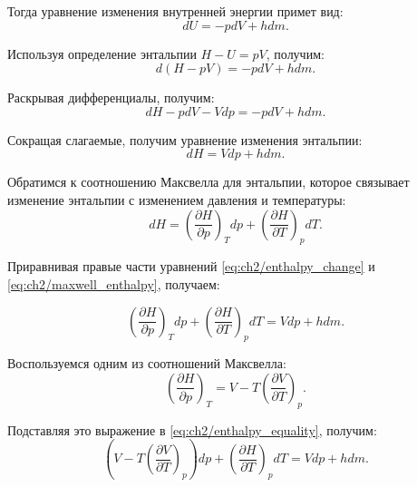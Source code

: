 Тогда уравнение изменения внутренней энергии примет вид:
\begin{equation}\label{eq:ch2/internal_energy_change}
    dU = -pdV + hdm.
\end{equation}

Используя определение энтальпии $H - U = pV$, получим:
\begin{equation}\label{eq:ch2/enthalpy_definition}
    d(H-pV) = -pdV + hdm.
\end{equation}

Раскрывая дифференциалы, получим:
\begin{equation}\label{eq:ch2/enthalpy_differential}
    dH - pdV - Vdp = -pdV + hdm.
\end{equation}

Сокращая слагаемые, получим уравнение изменения энтальпии:
\begin{equation}\label{eq:ch2/enthalpy_change}
    dH = Vdp + hdm.
\end{equation}

Обратимся к соотношению Максвелла для энтальпии, которое связывает изменение
энтальпии с изменением давления и температуры:
\begin{equation}\label{eq:ch2/maxwell_enthalpy}
    dH = \left(
    \frac{\partial H}{\partial p}
    \right)_T dp + \left(
    \frac{\partial H}{\partial T}
    \right)_p dT.
\end{equation}

Приравнивая правые части уравнений \eqref{eq:ch2/enthalpy_change} и \eqref{eq:ch2/maxwell_enthalpy}, получаем:

\begin{equation}\label{eq:ch2/enthalpy_equality}
    \left(
    \frac{\partial H}{\partial p}
    \right)_T dp + \left(
    \frac{\partial H}{\partial T}
    \right)_p dT = Vdp + hdm.
\end{equation}

Воспользуемся одним из соотношений Максвелла:
\begin{equation}\label{eq:ch2/maxwell_relation}
    \left(
    \frac{\partial H}{\partial p}
    \right)_T = V - T \left(
    \frac{\partial V}{\partial T}
    \right)_p.
\end{equation}

Подставляя это выражение в \eqref{eq:ch2/enthalpy_equality}, получим:
\begin{equation}\label{eq:ch2/enthalpy_substitution}
    \left( V - T \left(
        \frac{\partial V}{\partial T}
        \right)_p \right) dp + \left(
    \frac{\partial H}{\partial T}
    \right)_p dT = Vdp + hdm.
\end{equation}

